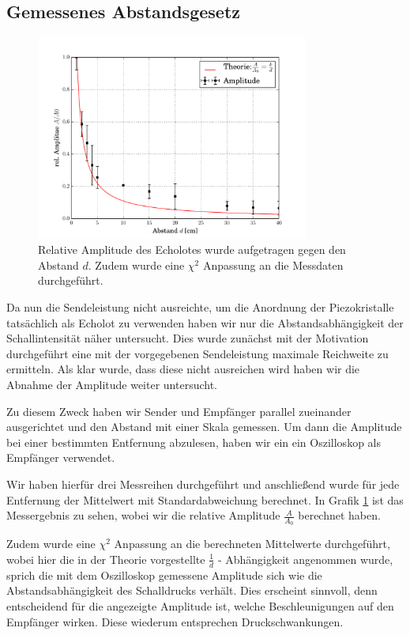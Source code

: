 \documentclass[12pt,a4paper,titlepage,headinclude,bibtotoc]{scrartcl}
\numberwithin{equation}{subsection}
\begin{document}
\subsection{Gemessenes Abstandsgesetz}
\begin{figure}[h]
	\centering
	\includegraphics[width=0.8\textwidth]{schall.pdf}
	\caption{Relative Amplitude des Echolotes wurde aufgetragen gegen den Abstand $d$. Zudem wurde eine $\chi^2$ Anpassung an die Messdaten durchgeführt.}
	\label{fig:schall}
\end{figure}
Da nun die Sendeleistung nicht ausreichte, um die Anordnung der Piezokristalle tatsächlich als Echolot zu verwenden haben wir nur die Abstandsabhängigkeit der Schallintensität näher untersucht. 
Dies wurde zunächst mit der Motivation durchgeführt eine mit der vorgegebenen Sendeleistung maximale Reichweite zu ermitteln. Als klar wurde, dass diese nicht ausreichen wird haben wir
die Abnahme der Amplitude weiter untersucht.

Zu diesem Zweck haben wir Sender und Empfänger parallel zueinander ausgerichtet und den Abstand mit einer Skala gemessen. Um dann die Amplitude bei einer bestimmten Entfernung abzulesen, haben wir ein
ein Oszilloskop als Empfänger verwendet.

Wir haben hierfür drei Messreihen durchgeführt und anschließend wurde für jede Entfernung der Mittelwert mit Standardabweichung berechnet. In Grafik \ref{fig:schall} ist das Messergebnis zu sehen, wobei wir die relative Amplitude $\frac{A}{A_0}$ berechnet haben.

Zudem wurde eine $\chi^2$ Anpassung an die berechneten Mittelwerte durchgeführt, wobei hier die in der Theorie vorgestellte $\frac{1}{d}$ - Abhängigkeit angenommen wurde, sprich die mit dem Oszilloskop gemessene Amplitude sich wie die Abstandsabhängigkeit des Schalldrucks verhält.
Dies erscheint sinnvoll, denn entscheidend für die angezeigte Amplitude ist, welche Beschleunigungen auf den Empfänger wirken.
Diese wiederum entsprechen Druckschwankungen.
\end{document}
